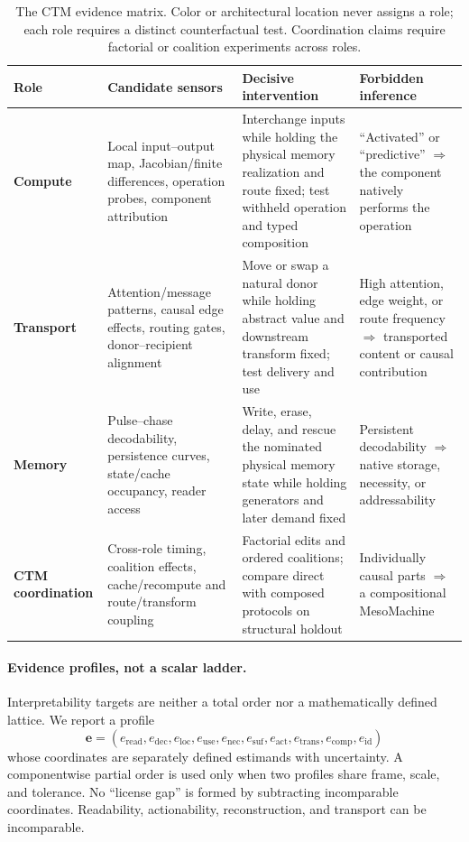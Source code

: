 \begin{table}[H]
\centering
\footnotesize
\caption{The CTM evidence matrix. Color or architectural location never assigns
a role; each role requires a distinct counterfactual test. Coordination claims
require factorial or coalition experiments across roles.}
\label{tab:ctm-evidence}
\begin{tabularx}{\textwidth}{P{0.12\textwidth}P{0.25\textwidth}P{0.31\textwidth}Y}
\toprule
Role & Candidate sensors & Decisive intervention & Forbidden inference\\
\midrule
\textcolor{MESOGold}{\textbf{Compute}} &
Local input--output map, Jacobian/finite differences, operation probes, component attribution &
Interchange inputs while holding the physical memory realization and route fixed; test withheld operation and typed composition &
``Activated'' or ``predictive'' $\Rightarrow$ the component natively performs the operation\\
\addlinespace
\textcolor{MESOTeal}{\textbf{Transport}} &
Attention/message patterns, causal edge effects, routing gates, donor--recipient alignment &
Move or swap a natural donor while holding abstract value and downstream transform fixed; test delivery and use &
High attention, edge weight, or route frequency $\Rightarrow$ transported content or causal contribution\\
\addlinespace
\textcolor{MESOBlue}{\textbf{Memory}} &
Pulse--chase decodability, persistence curves, state/cache occupancy, reader access &
Write, erase, delay, and rescue the nominated physical memory state while holding generators and later demand fixed &
Persistent decodability $\Rightarrow$ native storage, necessity, or addressability\\
\addlinespace
\textbf{CTM coordination} &
Cross-role timing, coalition effects, cache/recompute and route/transform coupling &
Factorial edits and ordered coalitions; compare direct with composed protocols on structural holdout &
Individually causal parts $\Rightarrow$ a compositional MesoMachine\\
\bottomrule
\end{tabularx}
\end{table}

\paragraph{Evidence profiles, not a scalar ladder.}

Interpretability targets are neither a total order nor a mathematically defined lattice. We report a profile
\[
\mathbf e=
(e_{\mathrm{read}},e_{\mathrm{dec}},e_{\mathrm{loc}},e_{\mathrm{use}},
e_{\mathrm{nec}},e_{\mathrm{suf}},e_{\mathrm{act}},
e_{\mathrm{trans}},e_{\mathrm{comp}},e_{\mathrm{id}})
\]
whose coordinates are separately defined estimands with uncertainty. A componentwise partial order is used only when two profiles share frame, scale, and tolerance. No ``license gap'' is formed by subtracting incomparable coordinates. Readability, actionability, reconstruction, and transport can be incomparable.

